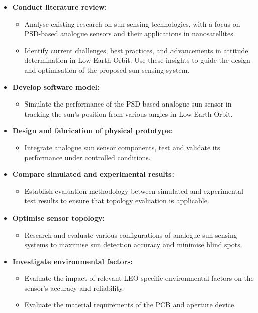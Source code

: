 \begin{itemize}
\item \textbf{Conduct literature review:}
\begin{itemize}
\item Analyse existing research on sun sensing technologies, with a focus on PSD-based analogue sensors and their applications in nanosatellites.
\item Identify current challenges, best practices, and advancements in attitude determination in Low Earth Orbit. Use these insights to guide the design and optimisation of the proposed sun sensing system.
\end{itemize}
\item \textbf{Develop software model:}
\begin{itemize}
    \item Simulate the performance of the PSD-based analogue sun sensor in tracking the sun's position from various angles in Low Earth Orbit.
\end{itemize}

\item \textbf{Design and fabrication of physical prototype:}
\begin{itemize}
    \item Integrate analogue sun sensor components, test and validate its performance under controlled conditions.
\end{itemize}

\item \textbf{Compare simulated and experimental results:}
\begin{itemize}
    \item Establish evaluation methodology between simulated and experimental test results to ensure that topology evaluation is applicable.
\end{itemize}

\item \textbf{Optimise sensor topology:}
\begin{itemize}
    \item Research and evaluate various configurations of analogue sun sensing systems to maximise sun detection accuracy and minimise blind spots.
\end{itemize}

\item \textbf{Investigate environmental factors:}
\begin{itemize}
    \item Evaluate the impact of relevant LEO specific environmental factors on the sensor's accuracy and reliability.
    \item Evaluate the material requirements of the PCB and aperture device.
\end{itemize}


\end{itemize}
